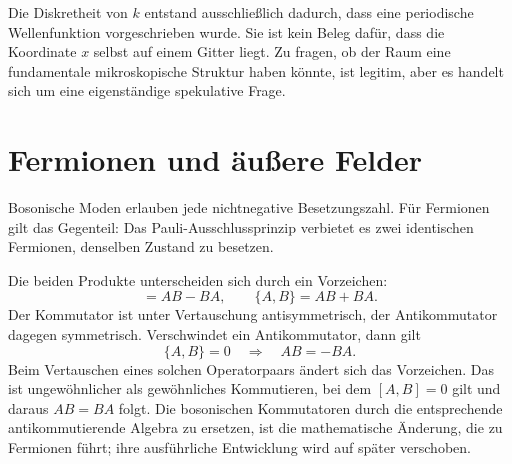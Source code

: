 
Die Diskretheit von \(k\) entstand ausschließlich dadurch, dass eine periodische Wellenfunktion vorgeschrieben wurde. Sie ist kein Beleg dafür, dass die Koordinate \(x\) selbst auf einem Gitter liegt. Zu fragen, ob der Raum eine fundamentale mikroskopische Struktur haben könnte, ist legitim, aber es handelt sich um eine eigenständige spekulative Frage.

\section{Fermionen und äußere Felder}

Bosonische Moden erlauben jede nichtnegative Besetzungszahl. Für Fermionen gilt das Gegenteil: Das Pauli-Ausschlussprinzip verbietet es zwei identischen Fermionen, denselben Zustand zu besetzen.

\begin{classroomqa}
\end{classroomqa}

Die beiden Produkte unterscheiden sich durch ein Vorzeichen:
\begin{equation}
[A,B]=AB-BA,
\qquad
\{A,B\}=AB+BA.
\end{equation}
Der Kommutator ist unter Vertauschung antisymmetrisch, der Antikommutator dagegen symmetrisch. Verschwindet ein Antikommutator, dann gilt
\begin{equation}
\{A,B\}=0
\quad\Longrightarrow\quad
AB=-BA.
\end{equation}
Beim Vertauschen eines solchen Operatorpaars ändert sich das Vorzeichen. Das ist ungewöhnlicher als gewöhnliches Kommutieren, bei dem \([A,B]=0\) gilt und daraus \(AB=BA\) folgt. Die bosonischen Kommutatoren durch die entsprechende antikommutierende Algebra zu ersetzen, ist die mathematische Änderung, die zu Fermionen führt; ihre ausführliche Entwicklung wird auf später verschoben.

